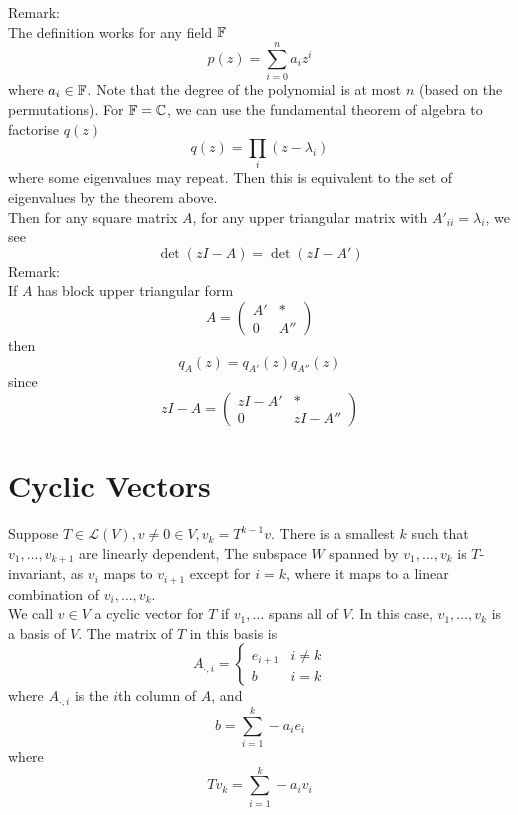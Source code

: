 \documentclass[12pt]{article}
\begin{document}
Remark: \\
The definition works for any field $\mathbb{F}$
$$p(z) = \sum_{i=0}^n a_iz^i$$
where $a_i\in\mathbb{F}$. Note that the degree of the polynomial is at most $n$ (based on the permutations).
For $\mathbb{F} = \mathbb{C}$, we can use the fundamental theorem of algebra to factorise $q(z)$
$$q(z) = \prod_i (z-\lambda_i)$$
where some eigenvalues may repeat. Then this is equivalent to the set of eigenvalues by the theorem above. \\
Then for any square matrix $A$, for any upper triangular matrix with $A'_{ii} = \lambda_i$, we see
$$\det(zI-A) = \det(zI-A')$$
Remark: \\
If $A$ has block upper triangular form
$$A = \begin{pmatrix} A' & * \\ 0 & A''\end{pmatrix}$$
then
$$q_A(z) = q_{A'}(z)q_{A''}(z)$$
since
$$zI-A = \begin{pmatrix} zI-A' & * \\ 0 & zI-A''\end{pmatrix}$$

\section{Cyclic Vectors}

Suppose $T\in\mathcal{L}(V),v\neq0\in V, v_k = T^{k-1}v$. There is a smallest $k$ such that $v_1,\dots,v_{k+1}$ are linearly dependent, The subspace $W$ spanned by $v_1,\dots,v_k$ is $T$-invariant, as $v_i$ maps to $v_{i+1}$ except for $i=k$, where it maps to a linear combination of $v_i,\dots,v_k$. \\
We call $v\in V$ a cyclic vector for $T$ if $v_1,\dots$ spans all of $V$. In this case, $v_1,\dots,v_k$ is a basis of $V$. The matrix of $T$ in this basis is
$$A_{\cdot,i} = \begin{cases} e_{i+1} & i\neq k \\ b & i = k\end{cases}$$
where $A_{\cdot,i}$ is the $i$th column of $A$, and
$$b = \sum_{i=1}^k -a_ie_i$$
where
$$Tv_k = \sum_{i=1}^k -a_iv_i$$
\end{document}
